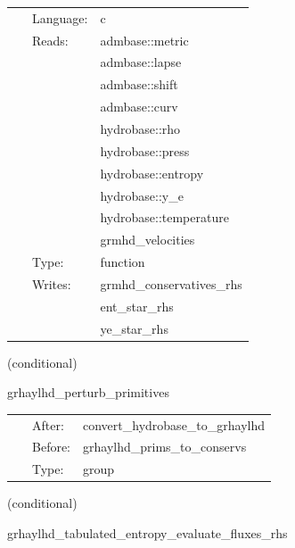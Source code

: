\documentclass{article}
\begin{document}
\hspace{5mm}

 \begin{tabular*}{160mm}{cll} 
~ & Language:  & c \\ 
~ & Reads:  & admbase::metric \\ 
~& ~ &admbase::lapse\\ 
~& ~ &admbase::shift\\ 
~& ~ &admbase::curv\\ 
~& ~ &hydrobase::rho\\ 
~& ~ &hydrobase::press\\ 
~& ~ &hydrobase::entropy\\ 
~& ~ &hydrobase::y\_e\\ 
~& ~ &hydrobase::temperature\\ 
~& ~ &grmhd\_velocities\\ 
~ & Type:  & function \\ 
~ & Writes:  & grmhd\_conservatives\_rhs \\ 
~& ~ &ent\_star\_rhs\\ 
~& ~ &ye\_star\_rhs\\ 
\end{tabular*} 


\vspace{5mm}

   (conditional) 

\hspace{5mm} grhaylhd\_perturb\_primitives 

\hspace{5mm}{\it perturb initial primitive data } 


\hspace{5mm}

 \begin{tabular*}{160mm}{cll} 
~ & After:  & convert\_hydrobase\_to\_grhaylhd \\ 
~ & Before:  & grhaylhd\_prims\_to\_conservs \\ 
~ & Type:  & group \\ 
\end{tabular*} 


\vspace{5mm}

   (conditional) 

\hspace{5mm} grhaylhd\_tabulated\_entropy\_evaluate\_fluxes\_rhs 

\hspace{5mm}{\it entropy+tabulated version of grhaylhd\_evaluate\_fluxes\_rhs } 
\end{document}
